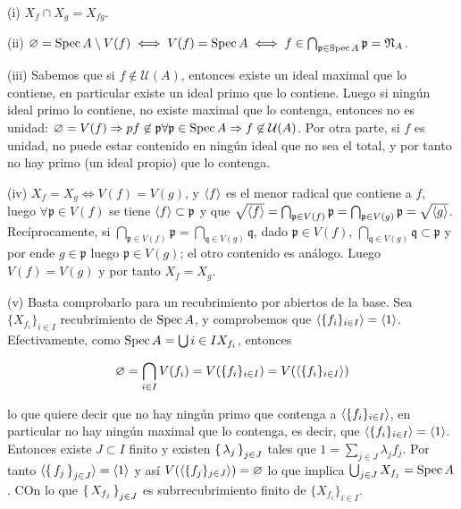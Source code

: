 \documentclass[../main.tex]{subfiles}
\begin{document}
(i) $X_f \cap X_g = X_{fg}$.

(ii) $\varnothing = \operatorname{Spec} A \setminus V(f) \iff V(f) = \operatorname{Spec} A \iff f \in \bigcap_{\mathfrak p \in \operatorname{Spec} A} \mathfrak p = \mathfrak N_A$.

(iii) Sabemos que si $f\not\in \mathcal U(A)$, entonces existe un ideal maximal que lo contiene, en particular existe un ideal primo que lo contiene. Luego si ningún ideal primo lo contiene, no existe maximal que lo contenga, entonces no es unidad:  $\varnothing = V(f) \Rightarrow pf \not \in \mathfrak p \forall \mathfrak p \in \operatorname{Spec} A \Rightarrow f \not\in \mathcal U(A)$. Por otra parte, si $f$ es unidad, no puede estar contenido en ningún ideal que no sea el total, y por tanto no hay primo (un ideal propio) que lo contenga.

(iv) $X_f = X_g \iff V(f) = V(g)$, y $\langle f \rangle$ es el menor radical que contiene a $f$, luego $\forall \mathfrak p \in V(f)$ se tiene $\langle f \rangle \subset \mathfrak p$ y que $\sqrt{\langle f \rangle} = \bigcap_{\mathfrak p \in V(f)} \mathfrak p = \bigcap_{\mathfrak p \in V(g)} \mathfrak{p} = \sqrt{\langle g \rangle}$.
Recíprocamente, si $\bigcap_{\mathfrak p \in V(f)} \mathfrak p = \bigcap_{\mathfrak q \in V(g)} \mathfrak{q}$, dado $\mathfrak p \in V(f)$, $ \bigcap_{\mathfrak{q} \in V(g)} \mathfrak{q} \subset \mathfrak{p}$ y por ende $g \in \mathfrak p$ luego $\mathfrak p \in V(g)$; el otro contenido es análogo. Luego $V(f) = V(g)$ y por tanto $X_f = X_g$.

(v) Basta comprobarlo para un recubrimiento por abiertos de la base. Sea $\{X_{f_i}\}_{i\in I}$ recubrimiento de $\operatorname{Spec} A$, y comprobemos que $\langle \{f_i\}_{i\in I} \rangle = \langle 1 \rangle$. Efectivamente, como $\operatorname{Spec} A = \bigcup{i\in I}X_{f_i} $, entonces

\begin{equation}
  \varnothing = \bigcap_{i\in I} V(f_i) = V(\{f_i\}_{i\in I}) = V(\langle \{f_i\}_{i\in I} \rangle)
\end{equation}

lo que quiere decir que no hay ningún primo que contenga a $\langle \{f_i\}_{i\in I} \rangle$, en particular no hay ningún maximal que lo contenga, es decir, que $\langle \{f_i\}_{i\in I} \rangle = \langle 1 \rangle$. Entonces existe $J\subset I$ finito y existen $\set{\lambda_j}_{j\in J}$ tales que $1 = \sum_{j\in J} \lambda_j f_j$.
Por tanto $\langle  \set{f_j}_{j\in J} \rangle = \langle  1 \rangle$ y así  $V(\langle \{f_j\}_{j\in J} \rangle )= \varnothing$ lo que implica $\bigcup_{j\in J} X_{f_j} = \operatorname{Spec} A$. COn lo que $\set{X_{f_j}}_{j\in J}$ es subrrecubrimiento finito de $\{X_{f_i}\}_{i\in I}$.
\end{document}
